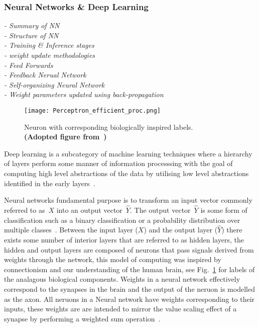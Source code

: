 \documentclass[../../D1.tex]{subfiles}
\begin{document}
\subsubsection{Neural Networks \& Deep Learning}
\emph{
    - Summary of NN\\
    - Structure of NN\\
    - Training \& Inference stages\\
    - weight update methodologies\\
    - Feed Forwards\\
    - Feedback Nerual Network\\
    - Self-organizing Neural Network\\
    - Weight parameters updated using back-propagation}


\begin{figure}
    \texttt{[image: Perceptron\_efficient\_proc.png]}
    \caption{Neuron with corresponding biologically inspired labels.\\ \textbf{(Adopted figure from~\autocite{szeEfficientProcessingDeep2017})}}
    \label{fig:neuronLabeled}
\end{figure}
Deep learning is a subcategory of machine learning techniques where a hierarchy of layers perform some manner of information processsing with the goal of computing high level abstractions of the data by utilising low level abstractions identified in the early layers~\autocite{dengTutorialSurveyArchitectures2014}.


Neural networks fundamental purpose is to transform an input vector commonly referred to as~$X$ into an output vector~$\hat{Y}$. 
The output vector~$\hat{Y}$ is some form of classification such as a binary classification or a probability distribution over multiple classes~\autocite{thierry-miegHowFundamentalConcepts}. 
Between the input layer ($X$) and the output layer ($\hat{Y}$) there exists some number of interior layers that are referred to as hidden layers, the hidden and output layers are composed of neurons that pass signals derived from weights through the network, this model of computing was inspired by connectionism and our understanding of the human brain, see Fig.~\ref{fig:neuronLabeled} for labels of the analagous biological components. 
Weights in a neural network effectively correspond to the synapses in the brain and the output of the neruon is modelled as the axon. 
All neruons in a Neural network have weights corresponding to their inputs, these weights are are intended to mirror the value scaling effect of a synapse by performing a weighted sum operation~\autocite{szeEfficientProcessingDeep2017}.
\end{document}
